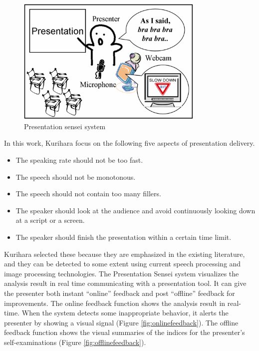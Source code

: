 \begin{figure}[htbp]
  \centering\includegraphics[width=0.8\textwidth]{./img/sensei.png}
  \caption[Presentation sensei system]{Presentation sensei system \cite{Kurihara2007}}
  \label{fig:sensei}
\end{figure}

\par In this work, Kurihara focus on the following five aspects of presentation delivery.
\begin{itemize}
  \item The speaking rate should not be too fast.
  \item The speech should not be monotonous.
  \item The speech should not contain too many fillers.
  \item The speaker should look at the audience and avoid continuously looking down at a script or a screen.
  \item The speaker should finish the presentation within a certain time limit.
\end{itemize}

\par Kurihara selected these because they are emphasized in the existing literature, and they can be detected to some extent using current speech processing and image processing technologies. The Presentation Sensei system visualizes the analysis result in real time communicating with a presentation tool. It can give the presenter both instant “online” feedback and post “offline” feedback for improvements. The online feedback function shows the analysis result in real-time. When the system detects some inappropriate behavior, it alerts the presenter by showing a visual signal (Figure \ref{fig:onlinefeedback}). The offline feedback function shows the visual summaries of the indices for the presenter’s self-examinations (Figure \ref{fig:offlinefeedback}).

